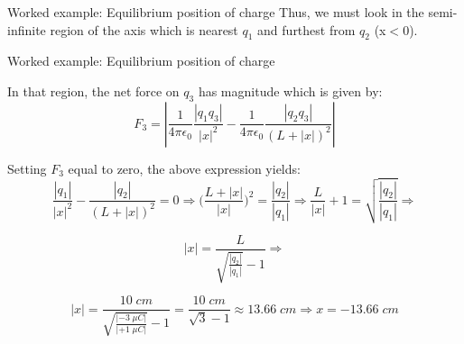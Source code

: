 {\begin{frame}{Worked example: Equilibrium position of charge}
  Thus, we must look in the semi-infinite region of the axis which is nearest
  $q_1$ and furthest from $q_2$ (x$<$0).

\end{frame}

%
%
%

\begin{frame}{Worked example: Equilibrium position of charge}

  In that region, the net force on $q_3$ has magnitude which is given by:
  \begin{equation*}
     F_{3} = \left\rvert
               \frac{1}{4\pi\epsilon_0} \frac{|q_1 q_3|}{|x|^2} -
               \frac{1}{4\pi\epsilon_0} \frac{|q_2 q_3|}{(L+|x|)^2}
              \right\rvert
  \end{equation*}

  Setting $F_{3}$ equal to zero, the above expression yields:
  \begin{equation*}
    \frac{|q_1|}{|x|^2} - \frac{|q_2|}{(L+|x|)^2} = 0 \Rightarrow
    \Big(\frac{L+|x|}{|x|} \Big)^{2} = \frac{|q_2|}{|q_1|} \Rightarrow
    \frac{L}{|x|} + 1 = \sqrt{\frac{|q_2|}{|q_1|}} \Rightarrow
  \end{equation*}

  \begin{equation*}
    |x| = \frac{L}{\sqrt{\frac{|q_2|}{|q_1|}} - 1} \Rightarrow
  \end{equation*}

  \begin{equation*}
    |x| = \frac{10\;cm}{\sqrt{\frac{|-3\;{\mu}C|}{|+1\;{\mu}C|}} - 1}
        = \frac{10\;cm}{\sqrt{3} - 1} \approx 13.66 \; cm
    \Rightarrow x = -13.66 \; cm
  \end{equation*}

\end{frame}

} %


%
%

